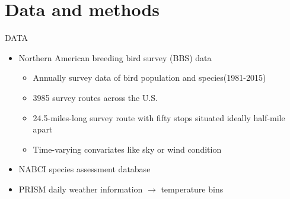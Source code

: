 \documentclass{beamer}
\begin{document}
\section{Data and methods}
\begin{frame}{DATA}
  \begin{itemize}
    \item Northern American breeding bird survey (BBS) data
    \hyperlink{BBS routes}{}
    \begin{itemize}
      \item
      Annually survey data of bird population and species(1981-2015)
      \item
      3985 survey routes across the U.S.
      \item
      24.5-miles-long survey route with fifty stops situated ideally half-mile apart
      \item
      Time-varying convariates like sky or wind condition
    \end{itemize}
    \item NABCI species assessment database
    \item PRISM daily weather information $\rightarrow$ temperature bins
    \hyperlink{Temperature bins}{}
  \end{itemize}
\end{frame}

\end{document}
